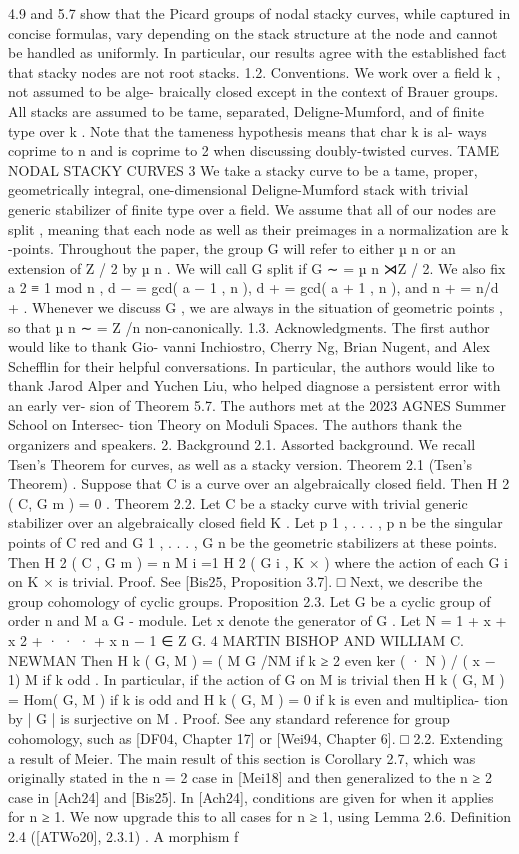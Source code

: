 \documentclass{article}
\begin{document}
4.9 and 5.7 show that the Picard groups of nodal stacky curves, while captured in concise formulas, vary depending on the stack structure at the node and cannot be handled as uniformly. In particular, our results agree with the established fact that stacky nodes are not root stacks. 1.2. Conventions. We work over a field k , not assumed to be alge- braically closed except in the context of Brauer groups. All stacks are assumed to be tame, separated, Deligne-Mumford, and of finite type over k . Note that the tameness hypothesis means that char k is al- ways coprime to n and is coprime to 2 when discussing doubly-twisted curves. TAME NODAL STACKY CURVES 3 We take a stacky curve to be a tame, proper, geometrically integral, one-dimensional Deligne-Mumford stack with trivial generic stabilizer of finite type over a field. We assume that all of our nodes are split , meaning that each node as well as their preimages in a normalization are k -points. Throughout the paper, the group G will refer to either µ n or an extension of Z / 2 by µ n . We will call G split if G ∼ = µ n ⋊Z / 2. We also fix a 2 ≡ 1 mod n , d − = gcd( a − 1 , n ), d + = gcd( a + 1 , n ), and n + = n/d + . Whenever we discuss G , we are always in the situation of geometric points , so that µ n ∼ = Z /n non-canonically. 1.3. Acknowledgments. The first author would like to thank Gio- vanni Inchiostro, Cherry Ng, Brian Nugent, and Alex Schefflin for their helpful conversations. In particular, the authors would like to thank Jarod Alper and Yuchen Liu, who helped diagnose a persistent error with an early ver- sion of Theorem 5.7. The authors met at the 2023 AGNES Summer School on Intersec- tion Theory on Moduli Spaces. The authors thank the organizers and speakers. 2. Background 2.1. Assorted background. We recall Tsen’s Theorem for curves, as well as a stacky version. Theorem 2.1 (Tsen’s Theorem) . Suppose that C is a curve over an algebraically closed field. Then H 2 ( C, G m ) = 0 . Theorem 2.2. Let C be a stacky curve with trivial generic stabilizer over an algebraically closed field K . Let p 1 , . . . , p n be the singular points of C red and G 1 , . . . , G n be the geometric stabilizers at these points. Then H 2 ( C , G m ) = n M i =1 H 2 ( G i , K × ) where the action of each G i on K × is trivial. Proof. See [Bis25, Proposition 3.7]. □ Next, we describe the group cohomology of cyclic groups. Proposition 2.3. Let G be a cyclic group of order n and M a G - module. Let x denote the generator of G . Let N = 1 + x + x 2 + · · · + x n − 1 ∈ Z G. 4 MARTIN BISHOP AND WILLIAM C. NEWMAN Then H k ( G, M ) = ( M G /NM if k ≥ 2 even ker ( · N ) / ( x − 1) M if k odd . In particular, if the action of G on M is trivial then H k ( G, M ) = Hom( G, M ) if k is odd and H k ( G, M ) = 0 if k is even and multiplica- tion by | G | is surjective on M . Proof. See any standard reference for group cohomology, such as [DF04, Chapter 17] or [Wei94, Chapter 6]. □ 2.2. Extending a result of Meier. The main result of this section is Corollary 2.7, which was originally stated in the n = 2 case in [Mei18] and then generalized to the n ≥ 2 case in [Ach24] and [Bis25]. In [Ach24], conditions are given for when it applies for n ≥ 1. We now upgrade this to all cases for n ≥ 1, using Lemma 2.6. Definition 2.4 ([ATWo20], 2.3.1) . A morphism f 
\end{document}
